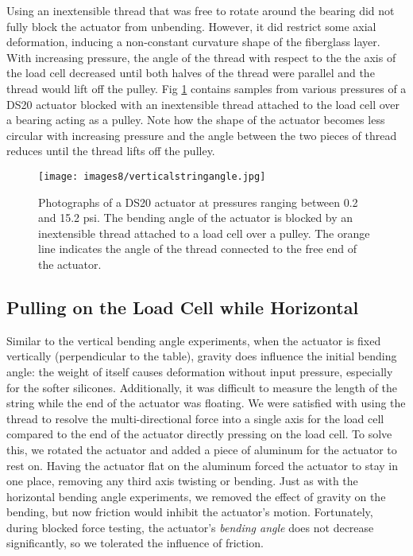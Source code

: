 Using an inextensible thread that was free to rotate around the bearing did not fully block the actuator from unbending. However, it did restrict some axial deformation, inducing a non-constant curvature shape of the fiberglass layer. With increasing pressure, the angle of the thread with respect to the the axis of the load cell decreased until both halves of the thread were parallel and the thread would lift off the pulley. Fig \ref{fig:verticalstringangle} contains samples from various pressures of a DS20 actuator blocked with an inextensible thread attached to the load cell over a bearing acting as a pulley. Note how the shape of the actuator becomes less circular with increasing pressure and the angle between the two pieces of thread reduces until the thread lifts off the pulley. 

\begin{figure}[ht]
    \centering
     \texttt{[image: images8/verticalstringangle.jpg]}
    \caption{Photographs of a DS20 actuator at pressures ranging between 0.2 and 15.2 psi. The bending angle of the actuator is blocked by an inextensible thread attached to a load cell over a pulley. The orange line indicates the angle of the thread connected to the free end of the actuator.}
    \label{fig:verticalstringangle}
\end{figure}

\clearpage
\subsection{Pulling on the Load Cell while Horizontal}

Similar to the vertical bending angle experiments, when the actuator is fixed vertically (perpendicular to the table), gravity does influence the initial bending angle: the weight of itself causes deformation without input pressure, especially for the softer silicones. Additionally, it was difficult to measure the length of the string while the end of the actuator was floating. We were satisfied with using the thread to resolve the multi-directional force into a single axis for the load cell compared to the end of the actuator directly pressing on the load cell. To solve this, we rotated the actuator and added a piece of aluminum for the actuator to rest on. Having the actuator flat on the aluminum forced the actuator to stay in one place, removing any third axis twisting or bending. Just as with the horizontal bending angle experiments, we removed the effect of gravity on the bending, but now friction would inhibit the actuator's motion. Fortunately, during blocked force testing, the actuator's \emph{bending angle} does not decrease significantly, so we tolerated the influence of friction. 

